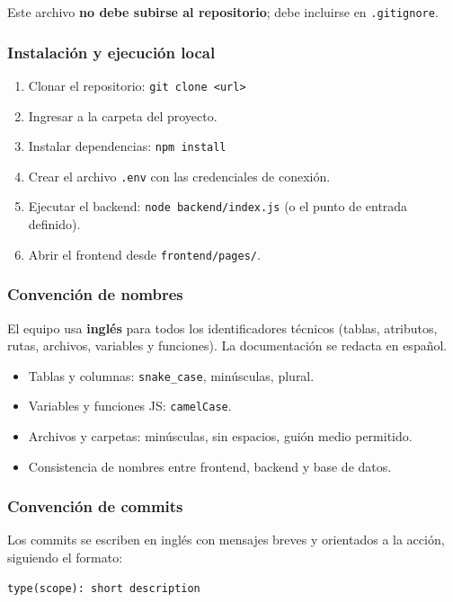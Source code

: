 \documentclass[12pt,a4paper]{article}
\begin{document}
Este archivo \textbf{no debe subirse al repositorio}; debe incluirse en \texttt{.gitignore}.

\subsubsection*{Instalación y ejecución local}

\begin{enumerate}
    \item Clonar el repositorio: \texttt{git clone <url>}
    \item Ingresar a la carpeta del proyecto.
    \item Instalar dependencias: \texttt{npm install}
    \item Crear el archivo \texttt{.env} con las credenciales de conexión.
    \item Ejecutar el backend: \texttt{node backend/index.js} (o el punto de entrada definido).
    \item Abrir el frontend desde \texttt{frontend/pages/}.
\end{enumerate}

\subsubsection*{Convención de nombres}

El equipo usa \textbf{inglés} para todos los identificadores técnicos (tablas, atributos, rutas, archivos, variables y funciones). La documentación se redacta en español.

\begin{itemize}
    \item Tablas y columnas: \texttt{snake\_case}, minúsculas, plural.
    \item Variables y funciones JS: \texttt{camelCase}.
    \item Archivos y carpetas: minúsculas, sin espacios, guión medio permitido.
    \item Consistencia de nombres entre frontend, backend y base de datos.
\end{itemize}

\subsubsection*{Convención de commits}

Los commits se escriben en inglés con mensajes breves y orientados a la acción, siguiendo el formato:

\begin{verbatim}
type(scope): short description
\end{verbatim}
\end{document}
